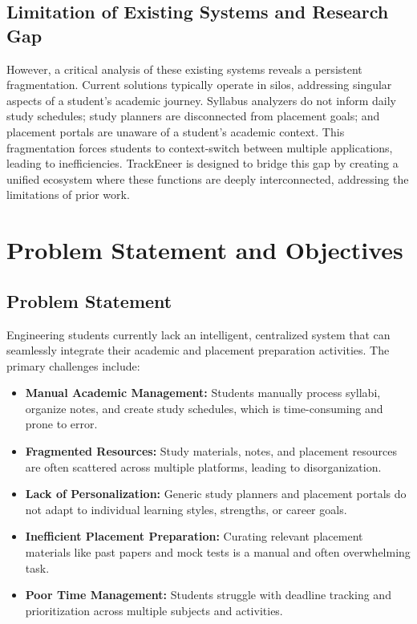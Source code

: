 \documentclass[12pt]{article}
\begin{document}
\subsection{Limitation of Existing Systems and Research Gap}
However, a critical analysis of these existing systems reveals a persistent fragmentation. Current solutions typically operate in silos, addressing singular aspects of a student's academic journey. Syllabus analyzers do not inform daily study schedules; study planners are disconnected from placement goals; and placement portals are unaware of a student's academic context. This fragmentation forces students to context-switch between multiple applications, leading to inefficiencies. TrackEneer is designed to bridge this gap by creating a unified ecosystem where these functions are deeply interconnected, addressing the limitations of prior work.

\section{Problem Statement and Objectives}
\subsection{Problem Statement}
Engineering students currently lack an intelligent, centralized system that can seamlessly integrate their academic and placement preparation activities. The primary challenges include:
\begin{itemize}
    \item \textbf{Manual Academic Management:} Students manually process syllabi, organize notes, and create study schedules, which is time-consuming and prone to error.
    \item \textbf{Fragmented Resources:} Study materials, notes, and placement resources are often scattered across multiple platforms, leading to disorganization.
    \item \textbf{Lack of Personalization:} Generic study planners and placement portals do not adapt to individual learning styles, strengths, or career goals.
    \item \textbf{Inefficient Placement Preparation:} Curating relevant placement materials like past papers and mock tests is a manual and often overwhelming task.
    \item \textbf{Poor Time Management:} Students struggle with deadline tracking and prioritization across multiple subjects and activities.
\end{itemize}
\end{document}
